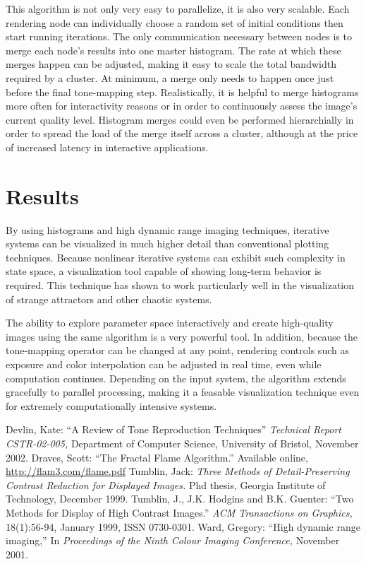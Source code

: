 \documentclass[letterpaper, 12pt]{article}
\begin{document}
This algorithm is not only very easy to parallelize, it is
also very scalable. Each rendering node can individually choose a random
set of initial conditions then start running iterations. The only communication necessary between
nodes is to merge each node's results into one master histogram. The rate at which these merges
happen can be adjusted, making it easy to scale the total bandwidth required by a cluster.
At minimum, a merge only needs to happen once just before the final tone-mapping
step. Realistically, it is helpful to merge histograms more often for interactivity reasons
or in order to continuously assess the image's current quality level. Histogram merges could even
be performed hierarchially in order to spread the load of the merge itself across a cluster, although
at the price of increased latency in interactive applications.

\section{Results}
By using histograms and high dynamic range imaging techniques, iterative systems can be
visualized in much higher detail than conventional plotting techniques.  Because
nonlinear iterative systems can exhibit such complexity in state space, a visualization
tool capable of showing long-term behavior is required. This technique has shown to
work particularly well in the visualization of strange attractors and other chaotic
systems.

The ability to explore parameter space interactively and create high-quality images
using the same algorithm is a very powerful tool.  In addition, because the tone-mapping
operator can be changed at any point, rendering controls such as exposure and color
interpolation can be adjusted in real time, even while computation continues. Depending
on the input system, the algorithm extends gracefully to parallel processing, making
it a feasable visualization technique even for extremely computationally intensive
systems.

\begin{thebibliography}{77}
 Devlin, Kate: ``A Review of Tone Reproduction Techniques'' {\it Technical Report CSTR-02-005,} Department of Computer Science, University of Bristol, November 2002.
 Draves, Scott: ``The Fractal Flame Algorithm.'' Available online, \url{http://flam3.com/flame.pdf}
 Tumblin, Jack: {\it Three Methods of Detail-Preserving Contrast Reduction for Displayed Images.} Phd thesis, Georgia Institute of Technology, December 1999.
 Tumblin, J., J.K. Hodgins and B.K. Guenter: ``Two Methods for Display of High Contrast Images.'' {\it ACM Transactions on Graphics,} 18(1):56-94, January 1999, ISSN 0730-0301.
 Ward, Gregory: ``High dynamic range imaging,'' In {\it Proceedings of the Ninth Colour Imaging Conference,} November 2001.
\end{thebibliography}
\end{document}
